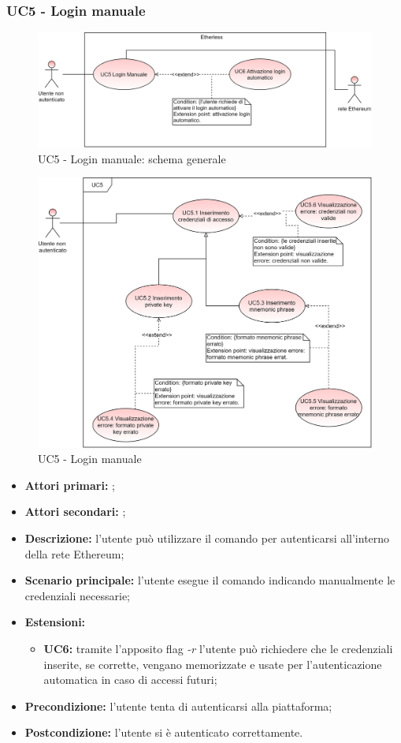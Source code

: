 \subsubsection{UC5 - Login manuale}
\begin{figure}[h]
	\centering
	\includegraphics[scale=\ucs]{./res/img/UC5G.png}
	\caption {UC5 - Login manuale: schema generale}
\end{figure}
\begin{figure}[h]
	\centering
	\includegraphics[scale=\ucs]{./res/img/UC5.png}
	\caption {UC5 - Login manuale}
\end{figure}
\begin{itemize}
	\item \textbf{Attori primari:} \una{};
	\item \textbf{Attori secondari:} \re{};
	\item \textbf{Descrizione:} l’utente può utilizzare il comando \login{} per autenticarsi all’interno della rete Ethereum; 
	\item \textbf{Scenario principale:} l'utente esegue il comando \login{} indicando manualmente le credenziali necessarie; 
	\item \textbf{Estensioni:} 
	\begin{itemize}
		\item \textbf{UC6:} tramite l’apposito flag \textit{-r} l’utente può richiedere che le credenziali inserite, se corrette, vengano memorizzate e usate per l'autenticazione automatica in caso di accessi futuri;
	\end{itemize}
	\item \textbf{Precondizione:} l’utente tenta di autenticarsi alla piattaforma;
	\item \textbf{Postcondizione:} l’utente si è autenticato correttamente.
\end{itemize}